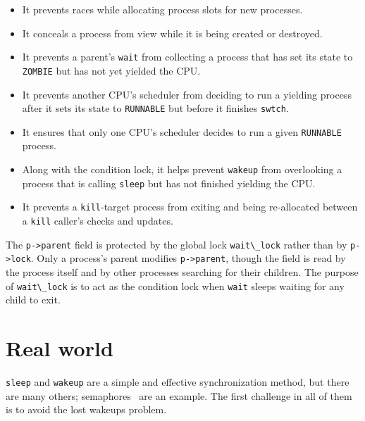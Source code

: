 \begin{itemize}

\item It prevents races while allocating process slots for new processes.

\item It conceals a process from view while it is being created
or destroyed.

\item It prevents a parent's \lstinline{wait} from collecting a process that
has set its state to \lstinline{ZOMBIE} but has not yet yielded the CPU.

\item It prevents another CPU's scheduler from deciding to run
a yielding process after it sets its state to \lstinline{RUNNABLE} but
before it finishes \lstinline{swtch}.

\item It ensures that only one CPU's scheduler decides to run a given
\lstinline{RUNNABLE} process.

\item Along with the condition lock, it helps prevent \lstinline{wakeup}
from overlooking a process that is calling \lstinline{sleep} but has not
finished yielding the CPU.

\item It prevents a \lstinline{kill}-target process from exiting and being
re-allocated between a \lstinline{kill} caller's checks and updates.

\end{itemize}

The \lstinline{p->parent} field is protected by the global lock
\lstinline{wait\_lock} rather than by \lstinline{p->lock}.
Only a process's parent modifies \lstinline{p->parent}, though
the field is read by the process itself and by other
processes searching for their children.
The purpose of \lstinline{wait\_lock} is to act as the condition lock when
\lstinline{wait} sleeps waiting for any child to exit.

\section{Real world}

\lstinline{sleep}
and
\lstinline{wakeup}
are a simple and effective synchronization method,
but there are many others;
semaphores~\cite{dijkstra65} are an example.
The first challenge in all of them is to
avoid the lost wakeups problem.

